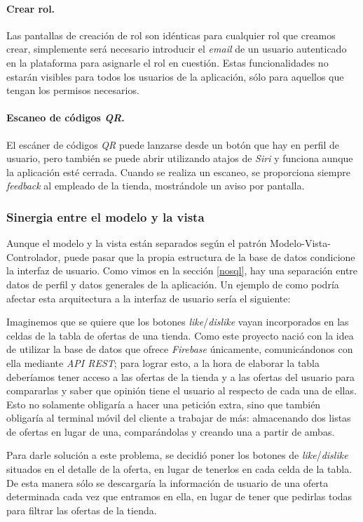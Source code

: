 \paragraph{Crear rol.} Las pantallas de creación de rol son idénticas para cualquier rol que creamos crear, simplemente será necesario introducir el \textit{email} de un usuario autenticado en la plataforma para asignarle el rol en cuestión. Estas funcionalidades no estarán visibles para todos los usuarios de la aplicación, sólo para aquellos que tengan los permisos necesarios.

\paragraph{Escaneo de códigos \textit{QR}.} El escáner de códigos \textit{QR} puede lanzarse desde un botón que hay en perfil de usuario, pero también se puede abrir utilizando atajos de \textit{Siri} y funciona aunque la aplicación esté cerrada. Cuando se realiza un escaneo, se proporciona siempre \textit{feedback} al empleado de la tienda, mostrándole un aviso por pantalla.

\subsubsection*{Sinergia entre el modelo y la vista}
Aunque el modelo y la vista están separados según el patrón Modelo-Vista-Controlador, puede pasar que la propia estructura de la base de datos condicione la interfaz de usuario. Como vimos en la sección  \ref{nosql}, hay una separación entre datos de perfil y datos generales de la aplicación. Un ejemplo de como podría afectar esta arquitectura a la interfaz de usuario sería el siguiente:

Imaginemos que se quiere que los botones \textit{like}/\textit{dislike}  vayan incorporados en las celdas de la tabla de ofertas de una tienda. Como este proyecto nació con la idea de utilizar la base de datos que ofrece \textit{Firebase} únicamente, comunicándonos con ella mediante \textit{API REST}; para lograr esto, a la hora de elaborar la tabla deberíamos tener acceso a las ofertas de la tienda y a las ofertas del usuario para compararlas y saber que opinión tiene el usuario al respecto de cada una de ellas. Esto no solamente obligaría a hacer una petición extra, sino que también obligaría al terminal móvil del cliente a trabajar de más: almacenando dos listas de ofertas en lugar de una, comparándolas y creando una a partir de ambas.

Para darle solución a este problema, se decidió poner los botones de \textit{like}/\textit{dislike} situados en el detalle de la oferta, en lugar de tenerlos en cada celda de la tabla. De esta manera sólo se descargaría la información de usuario de una oferta determinada cada vez que entramos en ella, en lugar de tener que pedirlas todas para filtrar las ofertas de la tienda.


